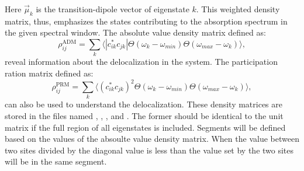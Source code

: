 Here $\vec{\mu}_k$ is the transition-dipole vector of eigenstate $k$.
This weighted density matrix, thus, emphasizes the states contributing to the absorption spectrum in the given spectral window.
The absolute value density matrix defined as:
\begin{equation}
	\rho^{\textrm{ADM}}_{ij}=\sum_k \Big\langle |c_{ik}^* c_{jk}|  \Theta(\omega_{k}-\omega_{min})\Theta(\omega_{max}-\omega_k)\Big\rangle,
\end{equation}
reveal information about the delocalization in the system.
The participation ration matrix defined as:
\begin{equation}
	\rho^{\textrm{PRM}}_{ij}=\sum_k \Big\langle (c_{ik}^* c_{jk})^2  \Theta(\omega_{k}-\omega_{min})\Theta(\omega_{max}-\omega_k)\Big\rangle,
\end{equation}
can also be used to understand the delocalization.
These density matrices are stored in the files named , , , and .
The former should be identical to the unit matrix if the full region of all eigenstates is included.
Segments will be defined based on the values of the absoulte value density matrix.
When the value between two sites divided by the diagonal value is less than the value set by  the two sites will be in the same segment. 

